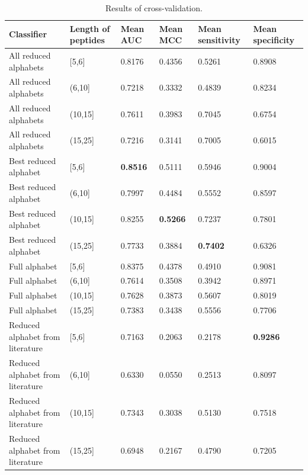 \documentclass{bioinfo}
\begin{document}
\begin{table}[ht]
\centering
\caption{Results of cross-validation.} 
\label{table:cv_summary}
\begin{tabular}{llllll}
  \toprule
Classifier & Length of peptides & Mean AUC & Mean MCC & Mean sensitivity & Mean specificity \\ 
  \midrule
All reduced alphabets & [5,6] & 0.8176 & 0.4356 & 0.5261 & 0.8908 \\ 
   \rowcolor[gray]{0.85}All reduced alphabets & (6,10] & 0.7218 & 0.3332 & 0.4839 & 0.8234 \\ 
  All reduced alphabets & (10,15] & 0.7611 & 0.3983 & 0.7045 & 0.6754 \\ 
   \rowcolor[gray]{0.85}All reduced alphabets & (15,25] & 0.7216 & 0.3141 & 0.7005 & 0.6015 \\ 
  Best reduced alphabet & [5,6] & \textbf{0.8516} & 0.5111 & 0.5946 & 0.9004 \\ 
   \rowcolor[gray]{0.85}Best reduced alphabet & (6,10] & 0.7997 & 0.4484 & 0.5552 & 0.8597 \\ 
  Best reduced alphabet & (10,15] & 0.8255 & \textbf{0.5266} & 0.7237 & 0.7801 \\ 
   \rowcolor[gray]{0.85}Best reduced alphabet & (15,25] & 0.7733 & 0.3884 & \textbf{0.7402} & 0.6326 \\ 
  Full alphabet & [5,6] & 0.8375 & 0.4378 & 0.4910 & 0.9081 \\ 
   \rowcolor[gray]{0.85}Full alphabet & (6,10] & 0.7614 & 0.3508 & 0.3942 & 0.8971 \\ 
  Full alphabet & (10,15] & 0.7628 & 0.3873 & 0.5607 & 0.8019 \\ 
   \rowcolor[gray]{0.85}Full alphabet & (15,25] & 0.7383 & 0.3438 & 0.5556 & 0.7706 \\ 
  Reduced alphabet from literature & [5,6] & 0.7163 & 0.2063 & 0.2178 & \textbf{0.9286} \\ 
   \rowcolor[gray]{0.85}Reduced alphabet from literature & (6,10] & 0.6330 & 0.0550 & 0.2513 & 0.8097 \\ 
  Reduced alphabet from literature & (10,15] & 0.7343 & 0.3038 & 0.5130 & 0.7518 \\ 
   \rowcolor[gray]{0.85}Reduced alphabet from literature & (15,25] & 0.6948 & 0.2167 & 0.4790 & 0.7205 \\ 
   \bottomrule
\end{tabular}
\end{table}
\end{document}
